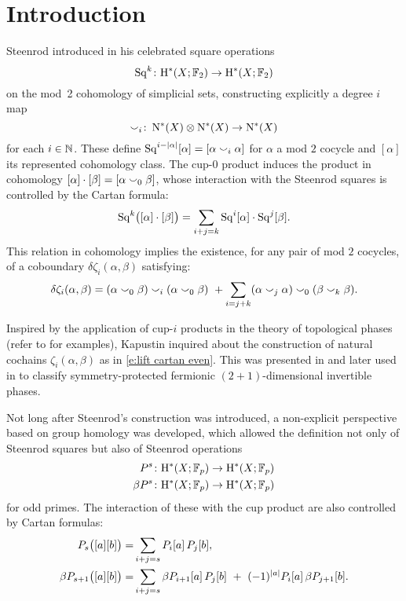 
\section{Introduction} \label{s:introduction}

\noindent Steenrod introduced in \cite{steenrod1947products} his celebrated square operations
\[
\operatorname{Sq}^k \colon \mathrm{H}^*(X; {\mathbb{F}_2}) \to \mathrm{H}^*(X; {\mathbb{F}_2})
\]
on the mod~2 cohomology of simplicial sets, constructing explicitly a degree $i$ map
\[
\smallsmile_i \colon \operatorname{N^{\ast}}(X) \otimes \operatorname{N^{\ast}}(X) \to \operatorname{N^{\ast}}(X)
\]
for each $i \in \mathbb{N}$.
These define $\operatorname{Sq}^{i-\lvert\alpha\rvert}[\alpha] = [\alpha \smallsmile_i \alpha]$ for $\alpha$ a mod $2$ cocycle and $[\alpha]$ its represented cohomology class.
The cup-$0$ product induces the product in cohomology $[\alpha] \cdot [\beta] = [\alpha \smallsmile_0 \beta]$, whose interaction with the Steenrod squares is controlled by the Cartan formula:
\[
\operatorname{Sq}^k\!\big([\alpha] \cdot [\beta]\big) = \sum_{i+j=k} \operatorname{Sq}^i [\alpha] \cdot \operatorname{Sq}^j[\beta].
\]
This relation in cohomology implies the existence, for any pair of mod $2$ cocycles, of a coboundary $\delta\zeta_i(\alpha,\beta)$ satisfying:
\begin{equation}\label{e:lift cartan even}
	\delta\zeta_i(\alpha, \beta) =
	(\alpha \smallsmile_0 \beta) \smallsmile_i (\alpha \smallsmile_0 \beta) \ +
	\sum_{i=j+k} (\alpha \smallsmile_j \alpha) \smallsmile_0 (\beta \smallsmile_k \beta).
\end{equation}

Inspired by the application of cup-$i$ products in the theory of topological phases (refer to \cite{kapustin2015cobordism, gaiotto2016spin, kapustin2017fermionic} for examples), Kapustin inquired about the construction of natural cochains $\zeta_i(\alpha, \beta)$ as in \eqref{e:lift cartan even}.
This was presented in \cite{medina2020cartan} and later used in \cite{barkeshli2021classification} to classify symmetry-protected fermionic $(2+1)$-dimensional invertible phases.

Not long after Steenrod's construction was introduced, a non-explicit perspective based on group homology was developed, which allowed the definition not only of Steenrod squares but also of Steenrod operations
\begin{align*}
	P^s \colon& \mathrm{H}^*(X; {\mathbb{F}_p}) \to \mathrm{H}^*(X; {\mathbb{F}_p}) \\
	\beta P^s \colon& \mathrm{H}^*(X; {\mathbb{F}_p}) \to \mathrm{H}^*(X; {\mathbb{F}_p})
\end{align*}
for odd primes.
The interaction of these with the cup product are also controlled by Cartan formulas:
\begin{align*}
	P_{s}\big([a][b]\big) =&
	\sum_{i+j=s} P_i[a] \, P_j[b], \\
	\beta P_{s+1}\big([a][b]\big) =&
	\sum_{i+j=s} \beta P_{i+1}[a] \, P_j[b] \ +\ (-1)^{\lvert a\rvert} P_i[a] \, \beta P_{j+1}[b].
\end{align*}

